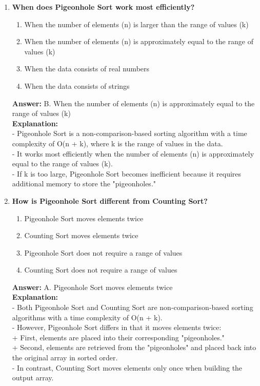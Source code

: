 \begin{enumerate}
    \item \textbf{When does Pigeonhole Sort work most efficiently?}
    \begin{enumerate}
        \item When the number of elements (n) is larger than the range of values (k)
        \item When the number of elements (n) is approximately equal to the range of values (k)
        \item When the data consists of real numbers
        \item When the data consists of strings
    \end{enumerate}
    \textbf{Answer:} B. When the number of elements (n) is approximately equal to the range of values (k) \\
    \textbf{Explanation:} \\
    - Pigeonhole Sort is a non-comparison-based sorting algorithm with a time complexity of O(n + k), where k is the range of values in the data. \\
    - It works most efficiently when the number of elements (n) is approximately equal to the range of values (k). \\
    - If k is too large, Pigeonhole Sort becomes inefficient because it requires additional memory to store the "pigeonholes."
    
    \item \textbf{How is Pigeonhole Sort different from Counting Sort?}
    \begin{enumerate}
        \item Pigeonhole Sort moves elements twice
        \item Counting Sort moves elements twice
        \item Pigeonhole Sort does not require a range of values
        \item Counting Sort does not require a range of values
    \end{enumerate}
    \textbf{Answer:} A. Pigeonhole Sort moves elements twice \\
    \textbf{Explanation:} \\
    - Both Pigeonhole Sort and Counting Sort are non-comparison-based sorting algorithms with a time complexity of O(n + k). \\
    - However, Pigeonhole Sort differs in that it moves elements twice: \\
    + First, elements are placed into their corresponding "pigeonholes." \\
    + Second, elements are retrieved from the "pigeonholes" and placed back into the original array in sorted order. \\
    - In contrast, Counting Sort moves elements only once when building the output array.
    

\end{enumerate}
